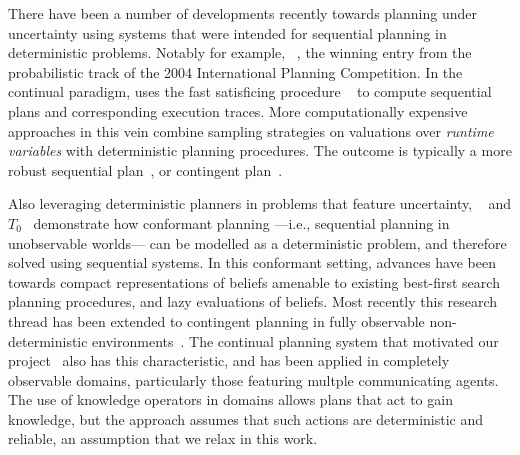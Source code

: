 There have been a number of developments recently towards planning
under uncertainty using systems that were intended for sequential
planning in deterministic problems.  Notably for example,
~\cite{yoon:etal:2007}, the winning entry from the
probabilistic track of the 2004 International Planning Competition.
In the continual paradigm,  uses the fast satisficing
procedure ~\cite{hoffmann:nebel:2001} to compute sequential
plans and corresponding execution traces.
More computationally expensive approaches in this vein combine
sampling strategies on valuations over {\em runtime variables} with
deterministic planning procedures. The outcome is typically a more
robust sequential plan~\cite{yoon:etal:2008}, or contingent
plan~\cite{majercik:2006}. 


Also leveraging deterministic planners in problems that feature
uncertainty, ~\cite{hoffmann:brafman:2006} and
$T_0$~\cite{palacios:geffner:2009} demonstrate how conformant planning
---i.e., sequential planning in unobservable worlds--- can be modelled
as a deterministic problem, and therefore solved using sequential
systems. In this conformant setting, advances have been towards
compact representations of beliefs amenable to existing best-first
search planning procedures, and lazy evaluations of beliefs. Most
recently this research thread has been extended to contingent planning
in fully observable non-deterministic
environments~\cite{albore:etal:2009}.
The continual planning system that motivated our
project~\cite{brenner:nebel:jaamas09} also has this characteristic,
and has been applied in completely observable domains, particularly
those featuring multple communicating agents. The use of knowledge
operators in domains allows plans that act to gain knowledge, but the
approach assumes that such actions are deterministic and reliable, an
assumption that we relax in this work.

